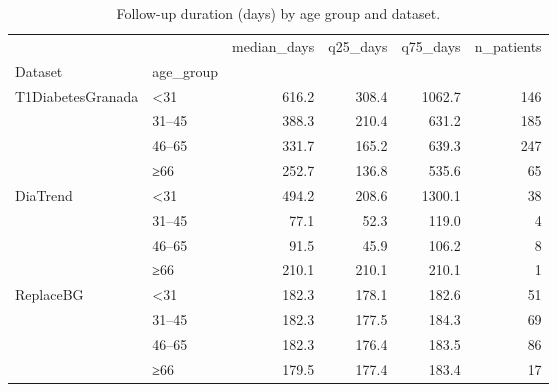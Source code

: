 \begin{table}
\caption{Follow-up duration (days) by age group and dataset.}
\label{tab:coverage_age}
\begin{tabular}{llrrrr}
\toprule
 &  & median\_days & q25\_days & q75\_days & n\_patients \\
Dataset & age_group &  &  &  &  \\
\midrule
\multirow[t]{4}{*}{T1DiabetesGranada} & <31 & 616.2 & 308.4 & 1062.7 & 146 \\
 & 31–45 & 388.3 & 210.4 & 631.2 & 185 \\
 & 46–65 & 331.7 & 165.2 & 639.3 & 247 \\
 & ≥66 & 252.7 & 136.8 & 535.6 & 65 \\
\cline{1-6}
\multirow[t]{4}{*}{DiaTrend} & <31 & 494.2 & 208.6 & 1300.1 & 38 \\
 & 31–45 & 77.1 & 52.3 & 119.0 & 4 \\
 & 46–65 & 91.5 & 45.9 & 106.2 & 8 \\
 & ≥66 & 210.1 & 210.1 & 210.1 & 1 \\
\cline{1-6}
\multirow[t]{4}{*}{ReplaceBG} & <31 & 182.3 & 178.1 & 182.6 & 51 \\
 & 31–45 & 182.3 & 177.5 & 184.3 & 69 \\
 & 46–65 & 182.3 & 176.4 & 183.5 & 86 \\
 & ≥66 & 179.5 & 177.4 & 183.4 & 17 \\
\cline{1-6}
\bottomrule
\end{tabular}
\end{table}
